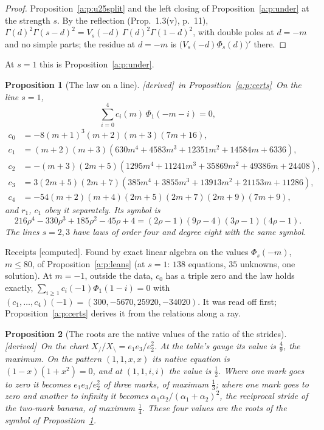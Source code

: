 \documentclass[11pt]{article}
\theoremstyle{plain}
\newtheorem{proposition}{Proposition}[section]
\theoremstyle{definition}
\theoremstyle{remark}
\newcommand{\derived}{\textup{[derived]}}
\newcommand{\computed}{\textup{[computed]}}
\begin{document}
\begin{proof}
Proposition~\ref{a:p:u25split} and the left closing of Proposition~\ref{a:p:under} at the strength $s$. By the reflection (Prop.~1.3(v), p.~11), $\Gamma(d)^2\Gamma(s-d)^2=V_s(-d)\,\Gamma(d)^2\Gamma(1-d)^2$, with double poles at $d=-m$ and no simple parts; the residue at $d=-m$ is $\big(V_s(-d)\Phi_s(d)\big)'$ there.
\end{proof}

At $s=1$ this is Proposition~\ref{a:p:under}.

\begin{proposition}[The law on a line]\label{a:p:u25law}\derived\ in Proposition~\ref{a:p:certs}\
On the line $s=1$,
\[
\sum_{i=0}^4c_i(m)\,\Phi_1(-m-i)=0,
\]
\begin{align*}
c_0&=-8(m+1)^3(m+2)(m+3)(7m+16),\\
c_1&=(m+2)(m+3)(630m^4+4583m^3+12351m^2+14584m+6336),\\
c_2&=-(m+3)(2m+5)(1295m^4+11241m^3+35869m^2+49386m+24408),\\
c_3&=3(2m+5)(2m+7)(385m^4+3855m^3+13913m^2+21153m+11286),\\
c_4&=-54(m+2)(m+4)(2m+5)(2m+7)(2m+9)(7m+9),
\end{align*}
and $r_1$, $c_1$ obey it separately. Its symbol is
\[
216\rho^4-330\rho^3+185\rho^2-45\rho+4=(2\rho-1)(9\rho-4)(3\rho-1)(4\rho-1).
\]
The lines $s=2,3$ have laws of order four and degree eight with the same symbol.
\end{proposition}

\noindent Receipts \computed. Found by exact linear algebra on the values $\Phi_s(-m)$, $m\le80$, of Proposition~\ref{a:p:leans} (at $s=1$: $138$ equations, $35$ unknowns, one solution). At $m=-1$, outside the data, $c_0$ has a triple zero and the law holds exactly, $\sum_{i\ge1}c_i(-1)\Phi_1(1-i)=0$ with $(c_1,\dots,c_4)(-1)=(300,-5670,25920,-34020)$. It was read off first; Proposition~\ref{a:p:certs} derives it from the relations along a ray.

\begin{proposition}[The roots are the native values of the ratio of the strides]\label{a:p:u25roots}\derived\
On the chart $X_{/}/X_{\setminus}=e_1e_3/e_2^2$. At the table's gauge its value is $\frac49$, the maximum. On the pattern $(1,1,x,x)$ its native equation is $(1-x)(1+x^2)=0$, and at $(1,1,i,i)$ the value is $\frac12$. Where one mark goes to zero it becomes $e_1e_3/e_2^2$ of three marks, of maximum $\frac13$; where one mark goes to zero and another to infinity it becomes $\alpha_1\alpha_2/(\alpha_1+\alpha_2)^2$, the reciprocal stride of the two-mark banana, of maximum $\frac14$. These four values are the roots of the symbol of Proposition~\ref{a:p:u25law}.
\end{proposition}
\end{document}
